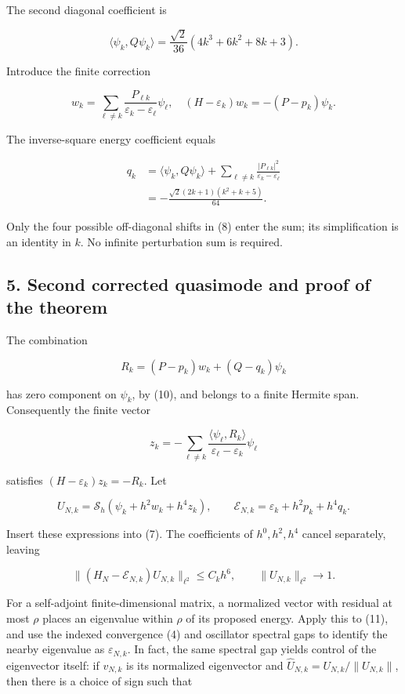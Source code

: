 \documentclass[
  10pt,
  a4paper,
]{article}
\begin{document}
The second diagonal coefficient is

\[
\langle\psi_k,Q\psi_k\rangle
=\frac{\sqrt2}{36}(4k^3+6k^2+8k+3).\tag{9}
\]

Introduce the finite correction

\[
w_k=\sum_{\ell\ne k}\frac{P_{\ell k}}{\varepsilon_k-\varepsilon_\ell}\psi_\ell,
\quad (H-\varepsilon_k)w_k=-(P-p_k)\psi_k.
\]

The inverse-square energy coefficient equals

\[
\begin{aligned}
q_k&=\langle\psi_k,Q\psi_k\rangle
+\sum_{\ell\ne k}\frac{|P_{\ell k}|^2}{\varepsilon_k-\varepsilon_\ell}\\
&=-\frac{\sqrt2(2k+1)(k^2+k+5)}{64}.
\end{aligned}\tag{10}
\]

Only the four possible off-diagonal shifts in (8) enter the sum; its simplification is an identity in \(k\). No infinite perturbation sum is required.

\subsection{5. Second corrected quasimode and proof of the theorem}\label{second-corrected-quasimode-and-proof-of-the-theorem}

The combination

\[
R_k=(P-p_k)w_k+(Q-q_k)\psi_k
\]

has zero component on \(\psi_k\), by (10), and belongs to a finite Hermite span. Consequently the finite vector

\[
z_k=-\sum_{\ell\ne k}
\frac{\langle\psi_\ell,R_k\rangle}{\varepsilon_\ell-\varepsilon_k}\psi_\ell
\]

satisfies \((H-\varepsilon_k)z_k=-R_k\). Let

\[
U_{N,k}=\mathcal S_h(\psi_k+h^2w_k+h^4z_k),\qquad
\mathcal E_{N,k}=\varepsilon_k+h^2p_k+h^4q_k.
\]

Insert these expressions into (7). The coefficients of \(h^0,h^2,h^4\) cancel separately, leaving

\[
\|(H_N-\mathcal E_{N,k})U_{N,k}\|_{\ell^2}\le C_k h^6,
\qquad\|U_{N,k}\|_{\ell^2}\longrightarrow1.\tag{11}
\]

For a self-adjoint finite-dimensional matrix, a normalized vector with residual at most \(\rho\) places an eigenvalue within \(\rho\) of its proposed energy. Apply this to (11), and use the indexed convergence (4) and oscillator spectral gaps to identify the nearby eigenvalue as \(\varepsilon_{N,k}\). In fact, the same spectral gap yields control of the eigenvector itself: if \(v_{N,k}\) is its normalized eigenvector and \(\widehat U_{N,k}=U_{N,k}/\|U_{N,k}\|\), then there is a choice of sign such that
\end{document}
